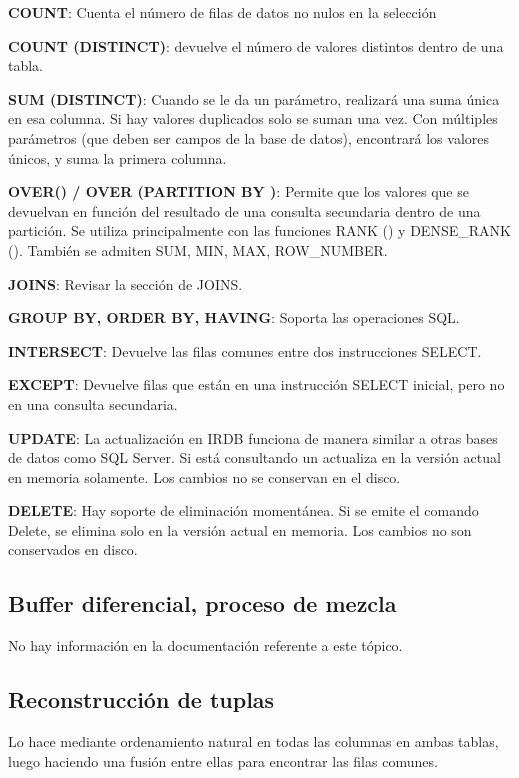 \documentclass{acmart}
\begin{document}
\textbf{COUNT}: Cuenta el número de filas de datos no nulos en la selección

\textbf{COUNT (DISTINCT)}: devuelve el número de valores distintos dentro de una tabla.

\textbf{SUM (DISTINCT)}: Cuando se le da un parámetro, realizará una suma única en esa columna. Si hay
valores duplicados solo se suman una vez. Con múltiples parámetros (que deben ser campos de la base de datos), encontrará los valores únicos, y suma la primera columna.

\textbf{OVER() / OVER (PARTITION BY )}: Permite que los valores que se devuelvan en función del resultado de una consulta secundaria dentro de una partición. Se utiliza principalmente con las funciones RANK () y DENSE\_RANK (). También se admiten SUM, MIN, MAX, ROW\_NUMBER.

\textbf{JOINS}: Revisar la sección de JOINS.

\textbf{GROUP BY, ORDER BY, HAVING}: Soporta las operaciones SQL.

\textbf{INTERSECT}: Devuelve las filas comunes entre dos instrucciones SELECT.

\textbf{EXCEPT}: Devuelve filas que están en una instrucción SELECT inicial, pero no en una consulta secundaria.

\textbf{UPDATE}: La actualización en IRDB funciona de manera similar a otras bases de datos como SQL Server. Si está consultando un actualiza en la versión actual en memoria solamente. Los cambios no se conservan en el disco.

\textbf{DELETE}: Hay soporte de eliminación momentánea. Si se emite el comando Delete, se elimina solo en la versión actual en memoria. Los cambios no son conservados en disco.

\subsection{Buffer diferencial, proceso de mezcla}

No hay información en la documentación referente a este tópico.

\subsection{Reconstrucción de tuplas}

Lo hace mediante ordenamiento natural en todas las columnas en ambas tablas, luego haciendo una fusión entre ellas para encontrar las filas comunes.
\end{document}
